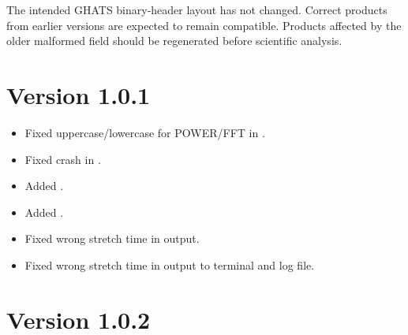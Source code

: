 \begin{ghatsnote}
The intended GHATS binary-header layout has not changed.  Correct products
from earlier versions are expected to remain compatible.  Products affected by
the older malformed  field should be regenerated before scientific
analysis.
\end{ghatsnote}

\section*{Version 1.0.1}

\begin{itemize}
\item Fixed uppercase/lowercase for POWER/FFT in .
\item Fixed crash in .
\item Added .
\item Added .
\item Fixed wrong stretch time in  output.
\item Fixed wrong stretch time in  output to terminal and log file.
\end{itemize}

\section*{Version 1.0.2}

